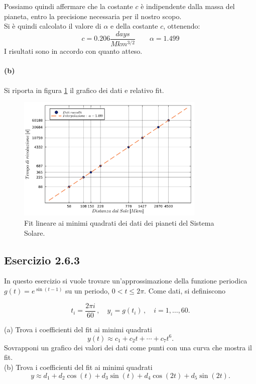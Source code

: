 \documentclass[letterpaper, 12pt]{article}
\begin{document}
Possiamo quindi affermare che la costante $c$ è indipendente dalla massa del pianeta, entro la precisione 
necessaria per il nostro scopo. \\
Si è quindi calcolato il valore di $\alpha$ e della costante $c$, ottenendo:
\begin{equation}
    c = 0.206 \frac{days}{Mkm^{3/2}}
    \qquad
    \alpha = 1.499
\end{equation}
I risultati sono in accordo con quanto atteso.

\paragraph{(b) } Si riporta in figura \ref{fig:es2_6_2_1} il grafico dei dati e relativo fit.

\begin{figure}[!ht]
    \centering
    \includegraphics[width=0.8\textwidth]{2621.pdf}
    \caption{Fit lineare ai minimi quadrati dei dati dei pianeti del Sistema Solare.}
    \label{fig:es2_6_2_1}
\end{figure}

\subsection{Esercizio 2.6.3}
In questo esercizio si vuole trovare un'approssimazione della funzione periodica $g(t)=e^{\sin(t-1)}$ su un 
periodo, $0 < t \le 2\pi$. Come dati, si definiscono

\begin{equation}
    t_i = \frac{2\pi i}{60}\,,
    \quad  
    y_i = g(t_i)\,,
    \quad i=1,\ldots,60.
\end{equation}
    
(a) Trova i coefficienti del fit ai minimi quadrati    
    \begin{equation}
    \label{eq:fit_pol}    
        y(t) \approx c_1 + c_2 t + \cdots + c_7 t^6.
    \end{equation}        
Sovrapponi un grafico dei valori dei dati come punti con una curva che mostra il fit. \\
(b) Trova i coefficienti del fit ai minimi quadrati
    \begin{equation}
    \label{eq:fit_fourier}
        y \approx d_1 + d_2\cos(t) + d_3\sin(t) + d_4\cos(2t) + d_5\sin(2t).
    \end{equation}
\end{document}
